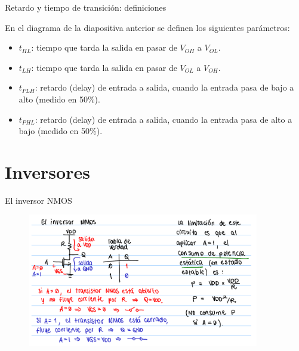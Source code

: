 \documentclass[t,aspectratio=169]{beamer}
\begin{document}
\begin{frame}{Retardo y tiempo de transición: definiciones}

En el diagrama de la diapositiva anterior se definen los siguientes parámetros:

\begin{itemize}
    \item $t_{HL}$: tiempo que tarda la salida en pasar de $V_{OH}$ a $V_{OL}$.
    \item $t_{LH}$: tiempo que tarda la salida en pasar de $V_{OL}$ a $V_{OH}$.
    \item $t_{PLH}$: retardo (delay) de entrada a salida, cuando la entrada pasa de bajo a alto (medido en 50\%).
    \item $t_{PHL}$: retardo (delay) de entrada a salida, cuando la entrada pasa de alto a bajo (medido en 50\%).
\end{itemize}

\end{frame}


\section{Inversores}
\begin{frame}{El inversor NMOS}

\vspace{-5mm}
\begin{figure}
    \centering
    \includegraphics[width=0.9\textwidth]{figuras/inversor_nmos.png}
\end{figure}

\end{frame}
\end{document}
